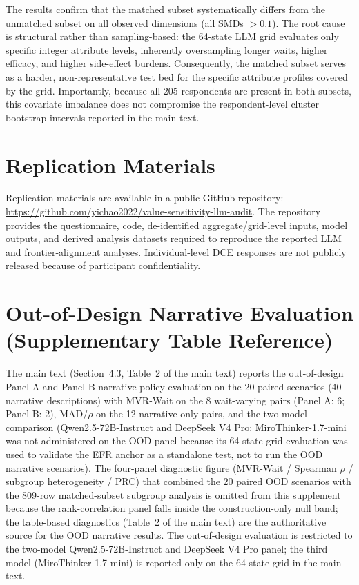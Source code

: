 \documentclass[11pt]{article}
\begin{document}
The results confirm that the matched subset systematically differs from the unmatched subset on all observed dimensions (all SMDs $> 0.1$). The root cause is structural rather than sampling-based: the 64-state LLM grid evaluates only specific integer attribute levels, inherently oversampling longer waits, higher efficacy, and higher side-effect burdens. Consequently, the matched subset serves as a harder, non-representative test bed for the specific attribute profiles covered by the grid. Importantly, because all 205 respondents are present in both subsets, this covariate imbalance does not compromise the respondent-level cluster bootstrap intervals reported in the main text.

\section{Replication Materials}
\label{app:replication}

Replication materials are available in a public GitHub repository:
\url{https://github.com/yichao2022/value-sensitivity-llm-audit}. The repository provides the questionnaire, code, de-identified aggregate/grid-level inputs, model outputs, and derived analysis datasets required to reproduce the reported LLM and frontier-alignment analyses. Individual-level DCE responses are not publicly released because of participant confidentiality.












\section{Out-of-Design Narrative Evaluation (Supplementary Table Reference)}
\label{app:ood_figure}

The main text (Section~4.3, Table~2 of the main text) reports the out-of-design Panel A and Panel B narrative-policy evaluation on the 20 paired scenarios (40 narrative descriptions) with MVR-Wait on the 8 wait-varying pairs (Panel A: 6; Panel B: 2), MAD/$\rho$ on the 12 narrative-only pairs, and the two-model comparison (Qwen2.5-72B-Instruct and DeepSeek V4 Pro; MiroThinker-1.7-mini was not administered on the OOD panel because its 64-state grid evaluation was used to validate the EFR anchor as a standalone test, not to run the OOD narrative scenarios). The four-panel diagnostic figure (MVR-Wait / Spearman $\rho$ / subgroup heterogeneity / PRC) that combined the 20 paired OOD scenarios with the 809-row matched-subset subgroup analysis is omitted from this supplement because the rank-correlation panel falls inside the construction-only null band; the table-based diagnostics (Table~2 of the main text) are the authoritative source for the OOD narrative results. The out-of-design evaluation is restricted to the two-model Qwen2.5-72B-Instruct and DeepSeek V4 Pro panel; the third model (MiroThinker-1.7-mini) is reported only on the 64-state grid in the main text.
\end{document}
